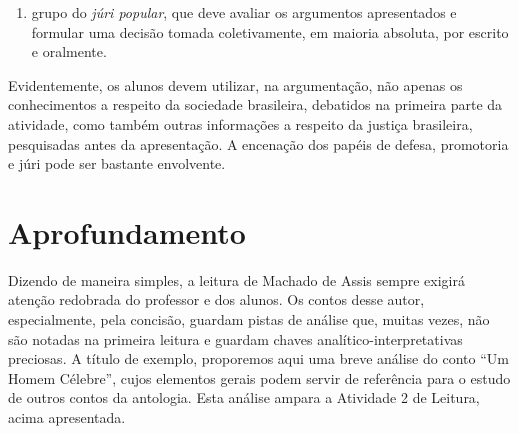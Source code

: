 \documentclass[11pt]{extarticle}
\begin{document}
\begin{enumerate}
\begin{enumerate}
\item grupo do \emph{júri popular}, que deve avaliar os argumentos
apresentados e formular uma decisão tomada coletivamente, em maioria
absoluta, por escrito e oralmente.
\end{enumerate}

Evidentemente, os alunos devem utilizar, na argumentação, não apenas os
conhecimentos a respeito da sociedade brasileira, debatidos na primeira
parte da atividade, como também outras informações a respeito da justiça
brasileira, pesquisadas antes da apresentação. A encenação dos papéis de
defesa, promotoria e júri pode ser bastante envolvente.
\end{enumerate}

\section{Aprofundamento}

Dizendo de maneira simples, a leitura de Machado de Assis sempre exigirá
atenção redobrada do professor e dos alunos. Os contos desse autor,
especialmente, pela concisão, guardam pistas de análise que, muitas
vezes, não são notadas na primeira leitura e guardam chaves
analítico-interpretativas preciosas. A título de exemplo, proporemos
aqui uma breve análise do conto ``Um Homem Célebre'', cujos elementos
gerais podem servir de referência para o estudo de outros contos da
antologia. Esta análise ampara a Atividade 2 de Leitura, acima
apresentada.
\end{document}
